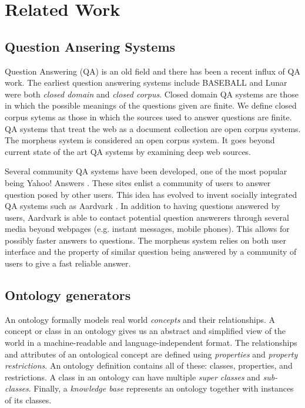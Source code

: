 \section{Related Work}
\label{sec:relatedwork}

\subsection{Question Ansering Systems} 

Question Answering (QA) is an old field and there has been a recent influx of QA work. The earliest question answering systems include BASEBALL \cite{Green1961} and Lunar \cite{woods1973} were both \emph{closed domain} and \emph{closed corpus}.  Closed domain QA systems are those in which the possible meanings of the questions given are finite. We define closed corpus sytems as those in which the sources used to answer questions are finite.  QA systems that treat the web as a document collection are open corpus systems.  The morpheus system is considered an open corpus system.  It goes beyond current state of the art QA systems by examining deep web sources.

Several community QA systems have been developed, one of the most popular being Yahoo! Answers \cite{yahooanswers2008}.  These sites enlist a community of users to answer question posed by other users.  This idea has evolved to invent socially integrated QA systems such as Aardvark \cite{vark2010}. In addition to having questions answered by users, Aardvark is able to contact potential question answerers through several media beyond webpages (e.g. instant messages, mobile phones).  This allows for possibly faster answers to questions.  The morpheus system relies on both user interface and the property of similar question being answered by a community of users to give a fast reliable answer.


\subsection{Ontology generators} 
\label{sec:ontology_generators}

An ontology formally models real world \textit{concepts} and their
relationships. A concept or class in an ontology gives us an abstract and
simplified view of the world\cite{Gruber1993} in a machine-readable and
language-independent format. The relationships and attributes of an
ontological concept are defined using \textit{properties} and \textit{property
restrictions}. An ontology definition contains all of
these: classes, properties, and restrictions. A class in an ontology can have
multiple \textit{super classes} and \textit{sub-classes}. Finally, a
\textit{knowledge base} represents an ontology together with 
instances of its classes.      

